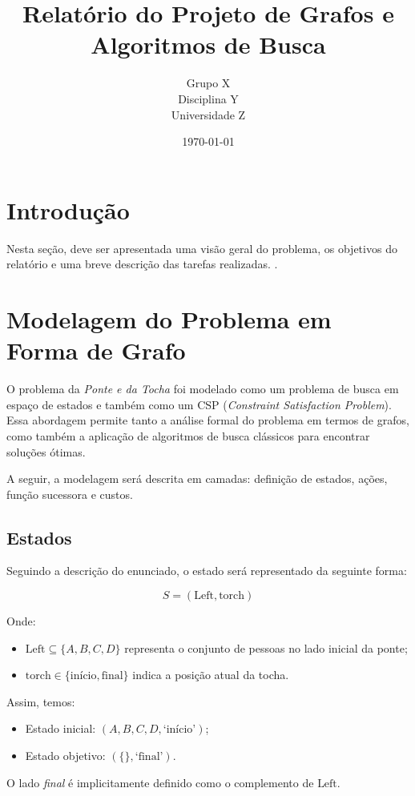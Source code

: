 \documentclass[12pt,a4paper]{article}
\title{Relatório do Projeto de Grafos e Algoritmos de Busca}
\author{Grupo X \\ Disciplina Y \\ Universidade Z}
\date{\today}
\begin{document}
\maketitle
\tableofcontents
\newpage

\section{Introdução}
Nesta seção, deve ser apresentada uma visão geral do problema, os objetivos do relatório e uma breve descrição das tarefas realizadas. 
\cite{cormen}.

\section{Modelagem do Problema em Forma de Grafo}
O problema da \textit{Ponte e da Tocha} foi modelado como um problema de busca em espaço de estados e também como um CSP (\textit{Constraint Satisfaction Problem}). Essa abordagem permite tanto a análise formal do problema em termos de grafos, como também a aplicação de algoritmos de busca clássicos para encontrar soluções ótimas. 

A seguir, a modelagem será descrita em camadas: definição de estados, ações, função sucessora e custos.

\subsection{Estados}
Seguindo a descrição do enunciado, o estado será representado da seguinte forma:

\[
S = (\text{Left}, \text{torch})
\]

Onde:
\begin{itemize}
    \item $\text{Left} \subseteq \{A, B, C, D\}$ representa o conjunto de pessoas no lado inicial da ponte;
    \item $\text{torch} \in \{\text{início}, \text{final}\}$ indica a posição atual da tocha.
\end{itemize}

Assim, temos:
\begin{itemize}
    \item Estado inicial: $({A, B, C, D}, \text{`início'})$;
    \item Estado objetivo: $(\{\}, \text{`final'})$.
\end{itemize}

O lado \textit{final} é implicitamente definido como o complemento de $\text{Left}$.
\end{document}

